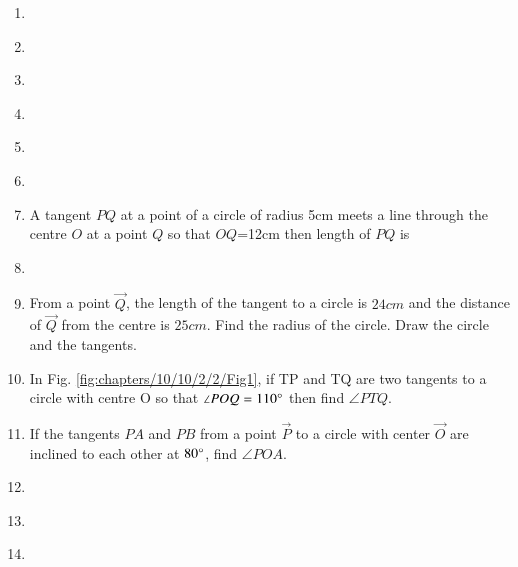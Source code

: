 \begin{enumerate}[label=\thesection.\arabic*,ref=\thesection.\theenumi]

\item 
\label{chapters/10/11/2/1}

\item 
\label{chapters/10/11/2/2}

\item 
\label{chapters/10/11/2/3}

\item 
\label{chapters/10/11/2/4}

\item 
\label{chapters/10/11/2/5}

\item 
\label{chapters/10/11/2/6}

\item A tangent $PQ$ at a point of a circle of radius 5cm meets a line through the centre $O$ at a point $Q$ so that $OQ$=12cm then length of $PQ$ is
\label{chapters/10/10/1/3}
\\
\solution

\item 
\label{chapters/10/10/1/4}

\item From a point $\vec{Q}$, the length of the tangent to a circle is $24 cm$ and the distance of $\vec{Q}$ from the centre is $25 cm$. Find the radius of the circle. Draw the circle and the tangents. 
\label{chapters/10/10/2/1}
\\
\solution

\item In Fig. \ref{fig:chapters/10/10/2/2/Fig1}, if TP and TQ are two tangents to a circle with centre O so that $\angle{POQ} = 110\degree$ then find $\angle{PTQ}$. 
\\
\solution

\item If the tangents $PA$ and $PB$ from a point $\vec{P}$ to a circle with center $\vec{O}$ are inclined to each other at $80{\degree}$, find $\angle{POA}$.
\\
\solution

\item 
\label{chapters/10/10/2/4}

\item 
\label{chapters/10/10/2/5}
%
\item 
\label{chapters/10/10/2/6}


\end{enumerate}
